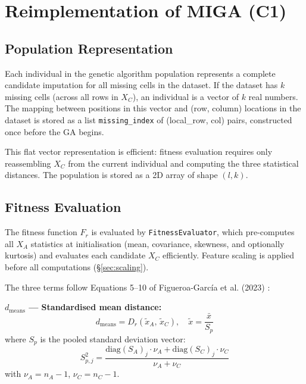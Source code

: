
\section{Reimplementation of MIGA (C1)}

\subsection{Population Representation}

Each individual in the genetic algorithm population represents a complete candidate imputation for all missing cells in the dataset. If the dataset has $k$ missing cells (across all rows in $X_C$), an individual is a vector of $k$ real numbers. The mapping between positions in this vector and (row, column) locations in the dataset is stored as a list \texttt{missing\_index} of (local\_row, col) pairs, constructed once before the GA begins.

This flat vector representation is efficient: fitness evaluation requires only reassembling $X_C$ from the current individual and computing the three statistical distances. The population is stored as a 2D array of shape $(l, k)$.

\subsection{Fitness Evaluation}

The fitness function $F_r$ is evaluated by \texttt{FitnessEvaluator}, which pre-computes all $X_A$ statistics at initialisation (mean, covariance, skewness, and optionally kurtosis) and evaluates each candidate $X_C$ efficiently. Feature scaling is applied before all computations (\S\ref{sec:scaling}).

The three terms follow Equations 5--10 of Figueroa-Garc\'ia et al. (2023) \cite{FigueroaGarcia2023}:

\textbf{$d_{\text{means}}$ --- Standardised mean distance:}
\begin{equation}
    d_{\text{means}} = D_r\!\left(\tilde{x}_A,\, \tilde{x}_C\right), \quad \tilde{x} = \frac{\bar{x}}{S_p}
\end{equation}
where $S_p$ is the pooled standard deviation vector:
\begin{equation}
    S_{p,j}^2 = \frac{\text{diag}(S_A)_j \cdot \nu_A + \text{diag}(S_C)_j \cdot \nu_C}{\nu_A + \nu_C}
\end{equation}
with $\nu_A = n_A - 1$, $\nu_C = n_C - 1$.

